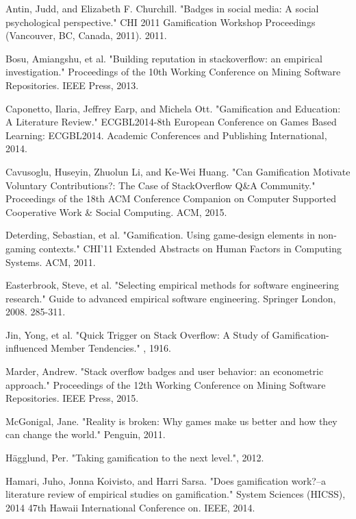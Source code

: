 \documentclass{sigchi}
\begin{document}
\begin{thebibliography}{9}

Antin, Judd, and Elizabeth F. Churchill. "Badges in social media: A social psychological perspective." CHI 2011 Gamification Workshop Proceedings (Vancouver, BC, Canada, 2011). 2011.

Bosu, Amiangshu, et al. "Building reputation in stackoverflow: an empirical investigation." Proceedings of the 10th Working Conference on Mining Software Repositories. IEEE Press, 2013.

Caponetto, Ilaria, Jeffrey Earp, and Michela Ott. "Gamification and Education: A Literature Review." ECGBL2014-8th European Conference on Games Based Learning: ECGBL2014. Academic Conferences and Publishing International, 2014.

Cavusoglu, Huseyin, Zhuolun Li, and Ke-Wei Huang. "Can Gamification Motivate Voluntary Contributions?: The Case of StackOverflow Q\&A Community." Proceedings of the 18th ACM Conference Companion on Computer Supported Cooperative Work \& Social Computing. ACM, 2015.

Deterding, Sebastian, et al. "Gamification. Using game-design elements in non-gaming contexts." CHI'11 Extended Abstracts on Human Factors in Computing Systems. ACM, 2011.

Easterbrook, Steve, et al. "Selecting empirical methods for software engineering research." Guide to advanced empirical software engineering. Springer London, 2008. 285-311.

Jin, Yong, et al. "Quick Trigger on Stack Overflow: A Study of Gamification-influenced Member Tendencies." , 1916.

Marder, Andrew. "Stack overflow badges and user behavior: an econometric approach." Proceedings of the 12th Working Conference on Mining Software Repositories. IEEE Press, 2015.

McGonigal, Jane. "Reality is broken: Why games make us better and how they can change the world." Penguin, 2011.

Hägglund, Per. "Taking gamification to the next level.", 2012.

Hamari, Juho, Jonna Koivisto, and Harri Sarsa. "Does gamification work?--a literature review of empirical studies on gamification." System Sciences (HICSS), 2014 47th Hawaii International Conference on. IEEE, 2014.


\end{thebibliography}
\end{document}
